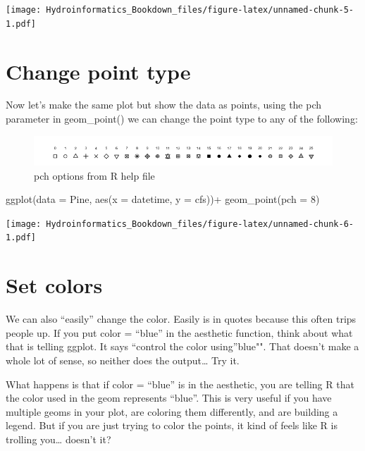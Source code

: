\documentclass[
]{book}
\newenvironment{Shaded}{\begin{snugshade}}{\end{snugshade}}
\newcommand{\AttributeTok}[1]{\textcolor[rgb]{0.77,0.63,0.00}{#1}}
\newcommand{\DecValTok}[1]{\textcolor[rgb]{0.00,0.00,0.81}{#1}}
\newcommand{\FunctionTok}[1]{\textcolor[rgb]{0.00,0.00,0.00}{#1}}
\newcommand{\NormalTok}[1]{#1}
\newcommand{\SpecialCharTok}[1]{\textcolor[rgb]{0.00,0.00,0.00}{#1}}
\begin{document}
\texttt{[image: Hydroinformatics\_Bookdown\_files/figure-latex/unnamed-chunk-5-1.pdf]}

\hypertarget{change-point-type}{%
\section{Change point type}\label{change-point-type}}

Now let's make the same plot but show the data as points, using the pch parameter in geom\_point() we can change the point type to any of the following:

\begin{figure}
\centering
\includegraphics{images/pch.png}
\caption{pch options from R help file}
\end{figure}

\begin{Shaded}
\begin{Highlighting}[]
\FunctionTok{ggplot}\NormalTok{(}\AttributeTok{data =}\NormalTok{ Pine, }\FunctionTok{aes}\NormalTok{(}\AttributeTok{x =}\NormalTok{ datetime, }\AttributeTok{y =}\NormalTok{ cfs))}\SpecialCharTok{+}
  \FunctionTok{geom\_point}\NormalTok{(}\AttributeTok{pch =} \DecValTok{8}\NormalTok{)}
\end{Highlighting}
\end{Shaded}

\texttt{[image: Hydroinformatics\_Bookdown\_files/figure-latex/unnamed-chunk-6-1.pdf]}

\hypertarget{set-colors}{%
\section{Set colors}\label{set-colors}}

We can also ``easily'' change the color. Easily is in quotes because this often trips people up. If you put color = ``blue'' in the aesthetic function, think about what that is telling ggplot. It says ``control the color using''blue"". That doesn't make a whole lot of sense, so neither does the output\ldots{} Try it.

What happens is that if color = ``blue'' is in the aesthetic, you are telling R that the color used in the geom represents ``blue''. This is very useful if you have multiple geoms in your plot, are coloring them differently, and are building a legend. But if you are just trying to color the points, it kind of feels like R is trolling you\ldots{} doesn't it?
\end{document}
